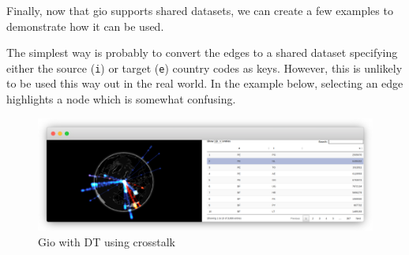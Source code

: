 \documentclass[
]{krantz}
\makeatletter
\newenvironment{Shaded}{\begin{snugshade}}{\end{snugshade}}
\newcommand{\CommentTok}[1]{\textcolor[rgb]{0.37,0.37,0.37}{\textit{#1}}}
\newcommand{\DataTypeTok}[1]{\textcolor[rgb]{0.27,0.27,0.27}{#1}}
\newcommand{\KeywordTok}[1]{\textcolor[rgb]{0.27,0.27,0.27}{\textbf{#1}}}
\newcommand{\NormalTok}[1]{#1}
\newcommand{\OperatorTok}[1]{\textcolor[rgb]{0.43,0.43,0.43}{\textbf{#1}}}
\newcommand{\StringTok}[1]{\textcolor[rgb]{0.5,0.5,0.5}{#1}}
\newenvironment{kframe}{%
\medskip{}
\setlength{\fboxsep}{.8em}
 \def\at@end@of@kframe{}%
 \ifinner\ifhmode%
  \def\at@end@of@kframe{\end{minipage}}%
  \begin{minipage}{\columnwidth}%
 \fi\fi%
 \def\FrameCommand##1{\hskip\@totalleftmargin \hskip-\fboxsep
 \colorbox{shadecolor}{##1}\hskip-\fboxsep
     \hskip-\linewidth \hskip-\@totalleftmargin \hskip\columnwidth}%
 \MakeFramed {\advance\hsize-\width
   \@totalleftmargin\z@ \linewidth\hsize
   \@setminipage}}%
 {\par\unskip\endMakeFramed%
 \at@end@of@kframe}
\renewenvironment{Shaded}{\begin{kframe}}{\end{kframe}}
\makeatother
\begin{document}
Finally, now that gio supports shared datasets, we can create a few examples to demonstrate how it can be used.

The simplest way is probably to convert the edges to a shared dataset specifying either the source (\texttt{i}) or target (\texttt{e}) country codes as keys. However, this is unlikely to be used this way out in the real world. In the example below, selecting an edge highlights a node which is somewhat confusing.

\begin{Shaded}
\end{Shaded}

\begin{figure}[t]

{\centering \includegraphics[width=1\linewidth]{images/crosstalk-gio-1} 

}

\caption{Gio with DT using crosstalk}\label{fig:crosstalk-gio-1}
\end{figure}
\end{document}
